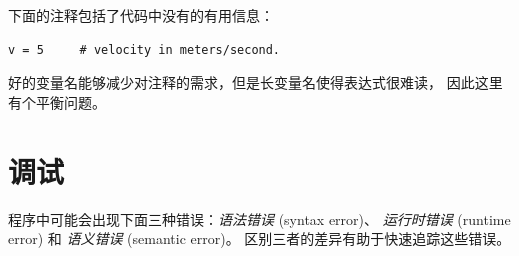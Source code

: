 %

下面的注释包括了代码中没有的有用信息：

\begin{lstlisting}
v = 5     # velocity in meters/second.
\end{lstlisting}

%

好的变量名能够减少对注释的需求，但是长变量名使得表达式很难读， 因此这里有个平衡问题。

%
\section{调试}
  
  


程序中可能会出现下面三种错误：{\em 语法错误} (syntax error)、 {\em 运行时错误} (runtime error) 和 {\em 语义错误} (semantic error)。 区别三者的差异有助于快速追踪这些错误。

